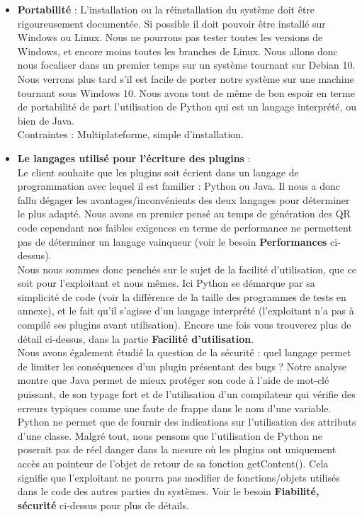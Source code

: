 \documentclass[a4paper,12pt]{article}
\begin{document}
\begin{itemize}
  \item \textbf{Portabilité} : L'installation ou la réinstallation du système doit être rigoureusement documentée. Si possible il doit pouvoir être installé sur Windows ou Linux. Nous ne pourrons pas tester toutes les versions de Windows, et encore moins toutes les branches de Linux. Nous allons donc nous focaliser dans un premier temps sur un système tournant sur Debian 10. Nous verrons plus tard s'il est facile de porter notre système sur une machine tournant sous Windows 10. Nous avons tout de même de bon espoir en terme de portabilité de part l'utilisation de Python qui est un langage interprété, ou bien de Java. \\
  Contraintes : Multiplateforme, simple d'installation.\\
  
  \item \textbf{Le langages utilisé pour l'écriture des plugins} :\\
  Le client souhaite que les plugins soit écrient dans un langage de programmation avec lequel il est familier : Python ou Java.
  Il nous a donc fallu dégager les avantages/inconvénients des deux langages pour déterminer le plus adapté. Nous avons en premier pensé au temps de génération des QR code cependant nos faibles exigences en terme de performance ne permettent pas de déterminer un langage vainqueur (voir le besoin \textbf{Performances} ci-dessus).\\
  
  Nous nous sommes donc penchés sur le sujet de la facilité d'utilisation, que ce soit pour l'exploitant et nous mêmes. Ici Python se démarque par sa simplicité de code (voir la différence de la taille des programmes de tests en annexe), et le fait qu'il s'agisse d'un langage interprété (l'exploitant n'a pas à compilé ses plugins avant utilisation). Encore une fois vous trouverez plus de détail ci-dessus, dans la partie \textbf{Facilité d'utilisation}.\\
  
  Nous avons également étudié la question de la sécurité : quel langage permet de limiter les conséquences d'un plugin présentant des bugs ? Notre analyse montre que Java permet de mieux protéger son code à l'aide de mot-clé puissant, de son typage fort et de l'utilisation d'un compilateur qui vérifie des erreurs typiques comme une faute de frappe dans le nom d'une variable. Python ne permet que de fournir des indications sur l'utilisation des attributs d'une classe. Malgré tout, nous pensons que l'utilisation de Python ne poserait pas de réel danger dans la mesure où les plugins ont uniquement accès au pointeur de l'objet de retour de sa fonction getContent(). Cela signifie que l'exploitant ne pourra pas modifier de fonctions/objets utilisés dans le code des autres parties du systèmes. Voir le besoin \textbf{Fiabilité, sécurité} ci-dessus pour plus de détails.\\
  

\end{itemize}
\end{document}
